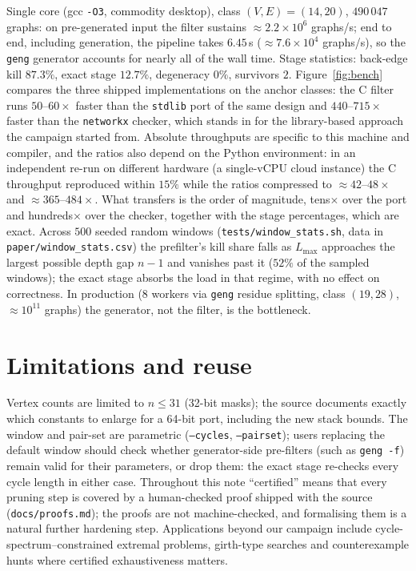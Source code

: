 \documentclass[11pt]{article}
\begin{document}
Single core (gcc \texttt{-O3}, commodity desktop), class
$(V,E)=(14,20)$, $490\,047$ graphs: on pre-generated input the
filter sustains $\approx 2.2\times 10^6$ graphs/s; end to end,
including generation, the pipeline takes $6.45$\,s
($\approx 7.6\times 10^4$ graphs/s), so the \texttt{geng} generator
accounts for nearly all of the wall time. Stage statistics:
back-edge kill $87.3\%$, exact stage $12.7\%$, degeneracy $0\%$,
survivors $2$. Figure~\ref{fig:bench} compares the three shipped
implementations on the anchor classes: the C filter runs
$50$--$60\times$ faster than the \texttt{stdlib} port of the same
design and $440$--$715\times$ faster than the \texttt{networkx}
checker, which stands in for the library-based approach the
campaign started from. Absolute throughputs are specific to this
machine and compiler, and the ratios also depend on the Python
environment: in an independent re-run on different hardware (a
single-vCPU cloud instance) the C throughput reproduced within
$15\%$ while the ratios compressed to $\approx 42$--$48\times$ and
$\approx 365$--$484\times$. What transfers is the order of
magnitude, tens$\times$ over the port and hundreds$\times$ over the
checker, together with the stage percentages, which are exact. Across $500$ seeded random
windows (\texttt{tests/window\_stats.sh}, data in
\texttt{paper/window\_stats.csv}) the prefilter's kill share falls
as $L_{\max}$ approaches the largest possible depth gap $n-1$ and
vanishes past it ($52\%$ of the sampled windows); the exact stage
absorbs the load in that regime, with no effect on correctness. In
production (8 workers via \texttt{geng} residue splitting,
class $(19,28)$, $\approx 10^{11}$ graphs) the generator, not the
filter, is the bottleneck.

\section{Limitations and reuse}

Vertex counts are limited to $n \le 31$ (32-bit masks); the source
documents exactly which constants to enlarge for a 64-bit port,
including the new stack bounds. The window and pair-set are
parametric (\texttt{--cycles}, \texttt{--pairset}); users replacing
the default window should check whether generator-side pre-filters
(such as \texttt{geng -f}) remain valid for their parameters, or
drop them: the exact stage re-checks every cycle length in either
case. Throughout this note ``certified'' means that every pruning
step is covered by a human-checked proof shipped with the source
(\texttt{docs/proofs.md}); the proofs are not machine-checked, and
formalising them is a natural further hardening step. Applications
beyond our campaign include cycle-spectrum--constrained
extremal problems, girth-type searches and counterexample hunts
where certified exhaustiveness matters.
\end{document}
